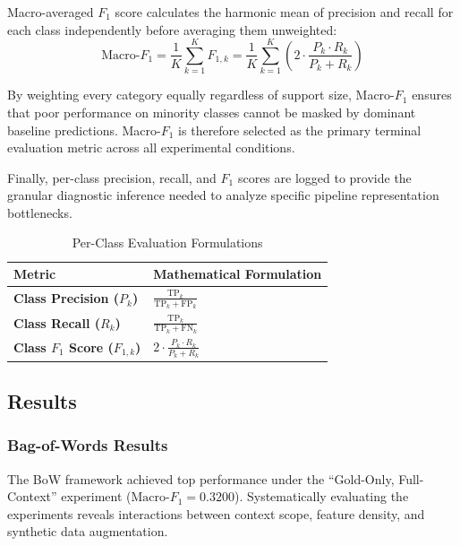 \documentclass[12pt, a4paper]{article}
\begin{document}
Macro-averaged $F_1$ score calculates the harmonic mean of precision and recall for each class independently before averaging them unweighted:
\[
\text{Macro-}F_1 = \frac{1}{K} \sum_{k=1}^{K} F_{1, k} = \frac{1}{K} \sum_{k=1}^{K} \left( 2 \cdot \frac{P_k \cdot R_k}{P_k + R_k} \right)
\]

By weighting every category equally regardless of support size, Macro-$F_1$ ensures that poor performance on minority classes cannot be masked by dominant baseline predictions. Macro-$F_1$ is therefore selected as the primary terminal evaluation metric across all experimental conditions.

Finally, per-class precision, recall, and $F_1$ scores are logged to provide the granular diagnostic inference needed to analyze specific pipeline representation bottlenecks.

\begin{table}[htbp]
  \centering
  \caption{Per-Class Evaluation Formulations}
  \label{tab:diagnostic_evaluation}
  \vspace{4pt}
  \small
  \setlength{\tabcolsep}{8pt}
  \begin{tabularx}{\textwidth}{l >{\centering\arraybackslash}X}
    \toprule
    \textbf{Metric} & \textbf{Mathematical Formulation} \\
    \midrule
    \textbf{Class Precision ($P_k$)} & $\frac{\text{TP}_k}{\text{TP}_k + \text{FP}_k}$ \\
    \addlinespace
    \textbf{Class Recall ($R_k$)} & $\frac{\text{TP}_k}{\text{TP}_k + \text{FN}_k}$ \\
    \addlinespace
    \textbf{Class $F_1$ Score ($F_{1, k}$)} & $2 \cdot \frac{P_k \cdot R_k}{P_k + R_k}$ \\
    \bottomrule
  \end{tabularx}
\end{table}


\subsection{Results}
\label{subsec:task1_results}

\subsubsection{Bag-of-Words Results}
\label{subsubsec:bow_results}

The BoW framework achieved top performance under the ``Gold-Only, Full-Context'' experiment ($\text{Macro-}F_1 = 0.3200$). Systematically evaluating the experiments reveals interactions between context scope, feature density, and synthetic data augmentation.
\end{document}
